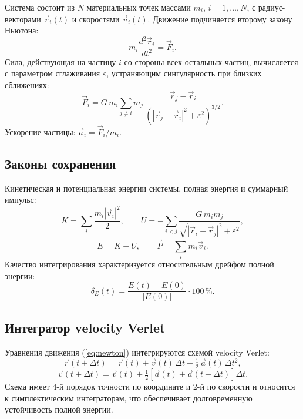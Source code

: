 \documentclass[12pt,a4paper]{article}
\begin{document}
	Система состоит из $N$ материальных точек массами $m_i$, $i = 1,\dots,N$, с радиус-векторами $\vec r_i(t)$ и скоростями $\vec v_i(t)$. Движение подчиняется второму закону Ньютона:
	\begin{equation}
		m_i \frac{d^2 \vec r_i}{dt^2} = \vec F_i .
		\label{eq:newton}
	\end{equation}
	Сила, действующая на частицу $i$ со стороны всех остальных частиц, вычисляется с параметром сглаживания $\varepsilon$, устраняющим сингулярность при близких сближениях:
	\begin{equation}
		\vec F_i = G\, m_i \sum_{j \ne i} m_j\,
		\frac{\vec r_j - \vec r_i}{\left( |\vec r_j - \vec r_i|^2 + \varepsilon^2 \right)^{3/2}} .
		\label{eq:force}
	\end{equation}
	Ускорение частицы: $\vec a_i = \vec F_i / m_i$.
	
	\subsection{Законы сохранения}
	
	Кинетическая и потенциальная энергии системы, полная энергия и суммарный импульс:
	\begin{equation}
		K = \sum_i \frac{m_i |\vec v_i|^2}{2}, \qquad
		U = - \sum_{i<j} \frac{G\, m_i m_j}{\sqrt{|\vec r_i - \vec r_j|^2 + \varepsilon^2}},
		\label{eq:energy}
	\end{equation}
	\begin{equation}
		E = K + U, \qquad \vec P = \sum_i m_i \vec v_i .
		\label{eq:conserv}
	\end{equation}
	Качество интегрирования характеризуется относительным дрейфом полной энергии:
	\begin{equation}
		\delta_E(t) = \frac{E(t) - E(0)}{|E(0)|} \cdot 100\,\% .
		\label{eq:drift}
	\end{equation}
	
	\subsection{Интегратор velocity Verlet}
	
	Уравнения движения (\ref{eq:newton}) интегрируются схемой velocity Verlet:
	\begin{equation}
		\vec r(t+\Delta t) = \vec r(t) + \vec v(t)\,\Delta t + \tfrac{1}{2}\, \vec a(t)\, \Delta t^2,
		\label{eq:verlet_r}
	\end{equation}
	\begin{equation}
		\vec v(t+\Delta t) = \vec v(t) + \tfrac{1}{2}\left[ \vec a(t) + \vec a(t+\Delta t) \right] \Delta t .
		\label{eq:verlet_v}
	\end{equation}
	Схема имеет 4-й порядок точности по координате и 2-й по скорости и относится к симплектическим интеграторам, что обеспечивает долговременную устойчивость полной энергии.
	
\end{document}

